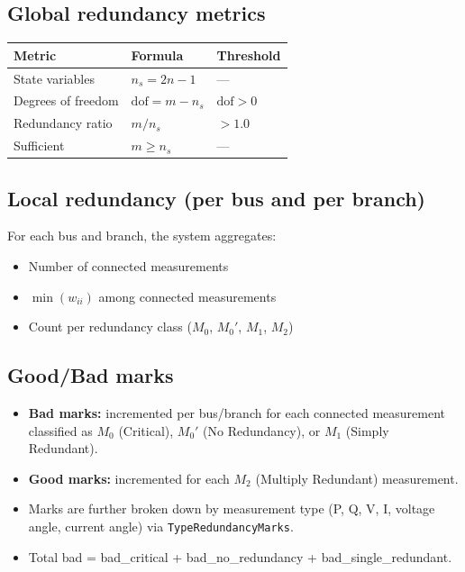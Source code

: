 \documentclass[11pt,a4paper]{article}
\begin{document}
\subsection{Global redundancy metrics}

\begin{center}
\small
\begin{tabular}{lll}
  \toprule
  \textbf{Metric} & \textbf{Formula} & \textbf{Threshold} \\
  \midrule
  State variables      & $n_s = 2n - 1$         & --- \\
  Degrees of freedom   & $\text{dof} = m - n_s$  & $\text{dof} > 0$ \\
  Redundancy ratio     & $m / n_s$               & $> 1.0$ \\
  Sufficient           & $m \ge n_s$             & --- \\
  \bottomrule
\end{tabular}
\end{center}

\subsection{Local redundancy (per bus and per branch)}

For each bus and branch, the system aggregates:
\begin{itemize}
  \item Number of connected measurements
  \item $\min(w_{ii})$ among connected measurements
  \item Count per redundancy class ($M_0$, $M_0'$, $M_1$, $M_2$)
\end{itemize}

\subsection{Good/Bad marks}

\begin{itemize}
  \item \textbf{Bad marks:} incremented per bus/branch for each connected
        measurement classified as $M_0$ (Critical), $M_0'$ (No
        Redundancy), or $M_1$ (Simply Redundant).
  \item \textbf{Good marks:} incremented for each $M_2$ (Multiply
        Redundant) measurement.
  \item Marks are further broken down by measurement type (P, Q, V, I,
        voltage angle, current angle) via \texttt{TypeRedundancyMarks}.
  \item Total bad = bad\_critical + bad\_no\_redundancy +
        bad\_single\_redundant.
\end{itemize}
\end{document}
